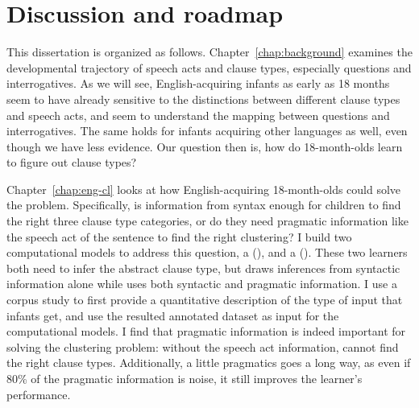 \section{Discussion and roadmap}
\label{sec:intro:roadmap}

This dissertation is organized as follows. Chapter~\ref{chap:background} examines the developmental trajectory of speech acts and clause types, especially questions and interrogatives. As we will see, English-acquiring infants as early as 18 months seem to have already sensitive to the distinctions between different clause types and speech acts, and seem to understand the mapping between questions and interrogatives. The same holds for infants acquiring other languages as well, even though we have less evidence. Our question then is, how do 18-month-olds learn to figure out clause types?

Chapter~\ref{chap:eng-cl} looks at how English-acquiring 18-month-olds could solve the problem. Specifically, is information from syntax enough for children to find the right three clause type categories, or do they need pragmatic information like the speech act of the sentence to find the right clustering? I build two computational models to address this question, a \distlearner{} (\dlearnerabbr{}), and a \praglearner{} (\plearnerabbr{}). These two learners both need to infer the abstract clause type, but \dlearnerabbr{} draws inferences from syntactic information alone while \plearnerabbr{} uses both syntactic and pragmatic information. I use a corpus study to first provide a quantitative description of the type of input that infants get, and use the resulted annotated dataset as input for the computational models. I find that pragmatic information is indeed important for solving the clustering problem: without the speech act information, \dlearnerabbr{} cannot find the right clause types. Additionally, a little pragmatics goes a long way, as  even if 80\% of the pragmatic information is noise, it still improves the learner's performance. 

